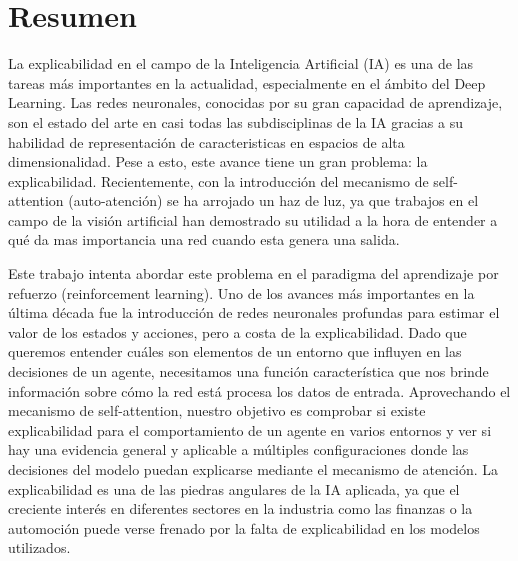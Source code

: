  \setcounter{page}{1}
\chapter*{Resumen}
La explicabilidad en el campo de la Inteligencia Artificial (IA) es una de las tareas más importantes en la actualidad, especialmente en el ámbito del Deep Learning. Las redes neuronales, conocidas por su gran capacidad de aprendizaje, son el estado del arte en casi todas las subdisciplinas de la IA gracias a su habilidad de representación de caracteristicas en espacios de alta dimensionalidad. Pese a esto, este avance tiene un gran problema: la explicabilidad. Recientemente, con la introducción del mecanismo de self-attention (auto-atención) se ha arrojado un haz de luz, ya que trabajos en el campo de la visión artificial han demostrado su utilidad a la hora de entender a qué da mas importancia una red cuando esta genera una salida.

Este trabajo intenta abordar este problema en el paradigma del aprendizaje por refuerzo (reinforcement learning). Uno de los avances más importantes en la última década fue la introducción de redes neuronales profundas para estimar el valor de los estados y acciones, pero a costa de la explicabilidad. Dado que queremos entender cuáles son elementos de un entorno que influyen en las decisiones de un agente, necesitamos una función característica que nos brinde información sobre cómo la red está procesa los datos de entrada. Aprovechando el mecanismo de self-attention, nuestro objetivo es comprobar si existe explicabilidad para el comportamiento de un agente en varios entornos y ver si hay una evidencia general y aplicable a múltiples configuraciones donde las decisiones del modelo puedan explicarse mediante el mecanismo de atención. La explicabilidad es una de las piedras angulares de la IA aplicada, ya que el creciente interés en diferentes sectores en la industria como las finanzas o la automoción puede verse frenado por la falta de explicabilidad en los modelos utilizados.

